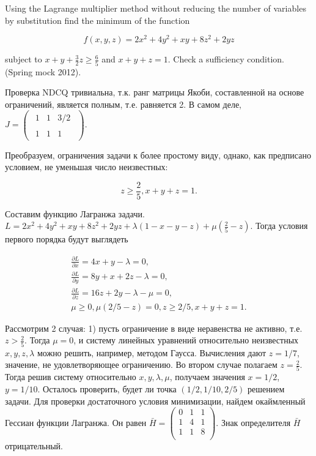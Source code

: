 \begin{problem}
Using the Lagrange multiplier method without reducing the number of variables by substitution find the minimum of the function

\[f(x,y,z)=2x^{2} +4y^{2} +xy+8z^{2} +2yz\] 

subject to $x+y+\frac{3}{2} z\ge \frac{6}{5} $ and $x+y+z=1$. Check a sufficiency condition. (Spring mock 2012).
\end{problem}

\begin{solution}
Проверка NDCQ тривиальна, т.к. ранг матрицы Якоби, составленной на основе ограничений, является полным, т.е. равняется 2. В самом деле, $J=\left(\begin{array}{c} {\begin{array}{ccc} {1} & {1} & {3/2} \end{array}} \\ {\begin{array}{ccc} {1} & {1} & {1} \end{array}} \end{array}\right)$.

Преобразуем, ограничения задачи к более простому виду, однако, как предписано условием, не уменьшая число неизвестных:

\[z\ge \frac{2}{5} , x+y+z=1.\] 

Составим функцию Лагранжа задачи. $L=2x^{2} +4y^{2} +xy+8z^{2} +2yz+\lambda (1-x-y-z)+\mu (\frac{2}{5} -z)$. Тогда условия первого порядка будут выглядеть

\[\begin{array}{l} {\frac{\partial L}{\partial x} =4x+y-\lambda =0,} \\ {\frac{\partial L}{\partial y} =8y+x+2z-\lambda =0,} \\ {\frac{\partial L}{\partial z} =16z+2y-\lambda -\mu =0,} \\ {\mu \ge 0,  \mu (2/5-z)=0,  z\ge 2/5,  x+y+z=1.} \end{array}\] 

Рассмотрим 2 случая: 1) пусть ограничение в виде неравенства не активно, т.е.$z>\frac{2}{5} $. Тогда $\mu =0$, и систему линейных уравнений относительно неизвестных $x,y,z,\lambda $ можно решить, например, методом Гаусса. Вычисления дают $z=1/7$, значение, не удовлетворяющее ограничению. Во втором случае полагаем $z=\frac{2}{5} $. Тогда решив систему относительно $x, y, \lambda, \mu $, получаем значения  $x=1/2$, $ y=1/10$. Осталось проверить, будет ли точка $(1/2,1/10,2/5)$ решением задачи. Для проверки достаточного условия минимизации, найдем окаймленный Гессиан функции Лагранжа. Он равен 
$\bar{H}=
\left(\begin{array}{ccc} 
0 &  1   &  1 \\
1 & {4} & {1} \\ 
1 & {1} & {8} \\
\end{array}\right)$. Знак определителя $\bar{H}$ отрицательный. 


\end{solution}

